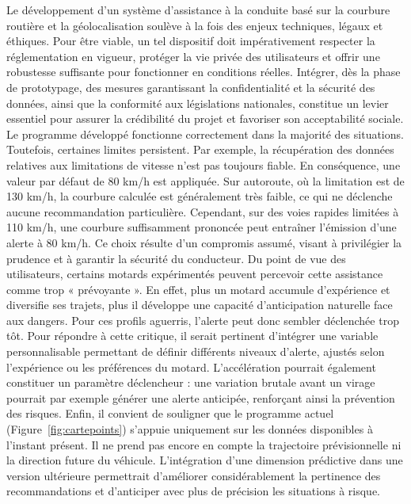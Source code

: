 Le développement d’un système d’assistance à la conduite basé sur la courbure routière et la géolocalisation soulève à la fois des enjeux techniques, légaux et éthiques. Pour être viable, un tel dispositif doit impérativement respecter la réglementation en vigueur, protéger la vie privée des utilisateurs et offrir une robustesse suffisante pour fonctionner en conditions réelles. Intégrer, dès la phase de prototypage, des mesures garantissant la confidentialité et la sécurité des données, ainsi que la conformité aux législations nationales, constitue un levier essentiel pour assurer la crédibilité du projet et favoriser son acceptabilité sociale.
Le programme développé fonctionne correctement dans la majorité des situations. Toutefois, certaines limites persistent. Par exemple, la récupération des données relatives aux limitations de vitesse n’est pas toujours fiable. En conséquence, une valeur par défaut de 80 km/h est appliquée. Sur autoroute, où la limitation est de 130 km/h, la courbure calculée est généralement très faible, ce qui ne déclenche aucune recommandation particulière. Cependant, sur des voies rapides limitées à 110 km/h, une courbure suffisamment prononcée peut entraîner l’émission d’une alerte à 80 km/h. Ce choix résulte d’un compromis assumé, visant à privilégier la prudence et à garantir la sécurité du conducteur.
Du point de vue des utilisateurs, certains motards expérimentés peuvent percevoir cette assistance comme trop « prévoyante ». En effet, plus un motard accumule d’expérience et diversifie ses trajets, plus il développe une capacité d’anticipation naturelle face aux dangers. Pour ces profils aguerris, l’alerte peut donc sembler déclenchée trop tôt.
Pour répondre à cette critique, il serait pertinent d’intégrer une variable personnalisable permettant de définir différents niveaux d’alerte, ajustés selon l’expérience ou les préférences du motard. L’accélération pourrait également constituer un paramètre déclencheur : une variation brutale avant un virage pourrait par exemple générer une alerte anticipée, renforçant ainsi la prévention des risques.
Enfin, il convient de souligner que le programme actuel (Figure~\ref{fig:cartepoints}) s’appuie uniquement sur les données disponibles à l’instant présent. Il ne prend pas encore en compte la trajectoire prévisionnelle ni la direction future du véhicule. L’intégration d’une dimension prédictive dans une version ultérieure permettrait d’améliorer considérablement la pertinence des recommandations et d’anticiper avec plus de précision les situations à risque.